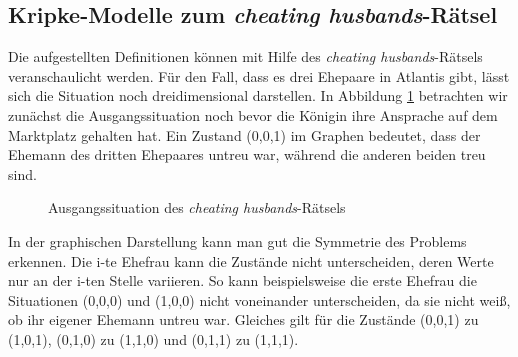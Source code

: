 \subsection{Kripke-Modelle zum \textit{cheating husbands}-Rätsel}
Die aufgestellten Definitionen können mit Hilfe des \textit{cheating husbands}-Rätsels veranschaulicht werden.
Für den Fall, dass es drei Ehepaare in Atlantis gibt, lässt sich die Situation noch dreidimensional darstellen.
In Abbildung \ref{ausgang} betrachten wir zunächst die Ausgangssituation noch bevor die Königin ihre Ansprache auf dem Marktplatz gehalten hat.
Ein Zustand (0,0,1) im Graphen bedeutet, dass der Ehemann des dritten Ehepaares untreu war, während die anderen beiden treu sind.

\begin{figure}
\centering
{}
\caption{Ausgangssituation des \textit{cheating husbands}-Rätsels}
\label{ausgang}
\end{figure}

In der graphischen Darstellung kann man gut die Symmetrie des Problems erkennen.
Die i-te Ehefrau kann die Zustände nicht unterscheiden, deren Werte nur an der i-ten Stelle variieren.
So kann beispielsweise die erste Ehefrau die Situationen (0,0,0) und (1,0,0) nicht voneinander unterscheiden, da sie nicht weiß, ob ihr eigener Ehemann untreu war. Gleiches gilt für die Zustände (0,0,1) zu (1,0,1), (0,1,0) zu (1,1,0) und (0,1,1) zu (1,1,1).\medskip

